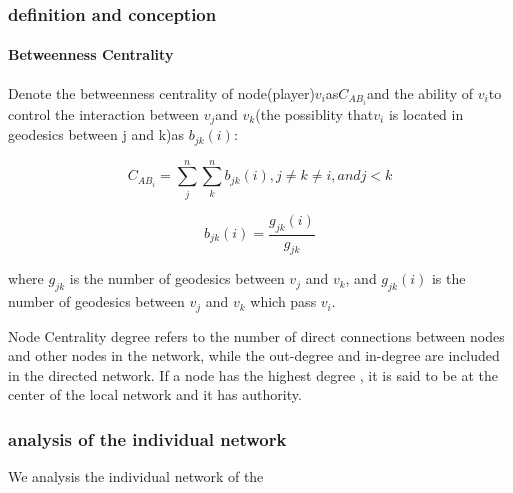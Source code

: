 \documentclass{mcmthesis}
\begin{document}
\subsubsection{definition and conception}
\paragraph{\textbf{Betweenness Centrality}}

Denote the betweenness centrality of node(player)$v_{i}$as$C_{AB_{i}}$and
the ability of $v_{i}$to control the interaction between $v_{j}$and
$v_{k}$(the possiblity that$v_{i}$ is located in geodesics between
j and k)as $b_{jk}(i)$:

\[
C_{AB_{i}}=\sum_{j}^{n}\sum_{k}^{n}b_{jk}(i),j\neq k\neq i,andj<k
\]

\[
b_{jk}(i)=\frac{g_{jk}(i)}{g_{jk}}
\]

where $g_{jk}$ is the number of geodesics between $v_{j}$ and $v_{k}$,
and $g_{jk}(i)$ is the number of geodesics between $v_{j}$ and $v_{k}$
which pass $v_{i}$.

Node Centrality degree refers to the number of direct connections between
nodes and other nodes in the network, while the out-degree and 
in-degree are included in the directed network. If a node has the highest degree
, it is said to be at the center of the local network and it has authority.

\subsubsection{analysis of the individual network}
\paragrapgh{}
We analysis the individual network of the 
\end{document}
